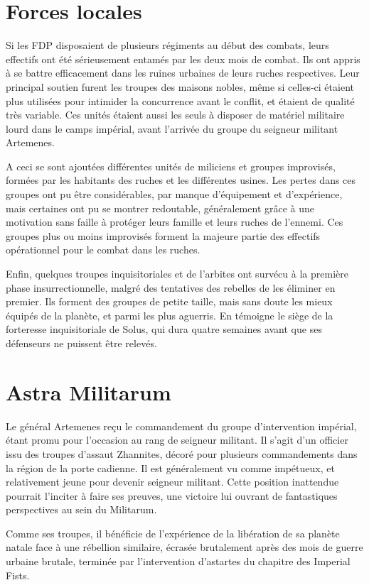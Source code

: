 \documentclass[10pt,a4paper]{book}
\begin{document}
\section{Forces locales}
Si les FDP disposaient de plusieurs régiments au début des combats, leurs effectifs ont été sérieusement entamés par les deux mois de combat. Ils ont appris à se battre efficacement dans les ruines urbaines de leurs ruches respectives. Leur principal soutien furent les troupes des maisons nobles, même si celles-ci étaient plus utilisées pour intimider la concurrence avant le conflit, et étaient de qualité très variable. Ces unités étaient aussi les seuls à disposer de matériel militaire lourd dans le camps impérial, avant l'arrivée du groupe du seigneur militant Artemenes.

A ceci se sont ajoutées différentes unités de miliciens et groupes improvisés, formées par les habitants des ruches et les différentes usines. Les pertes dans ces groupes ont pu être considérables, par manque d'équipement et d'expérience, mais certaines ont pu se montrer redoutable, généralement grâce à une motivation sans faille à protéger leurs famille et leurs ruches de l'ennemi. Ces groupes plus ou moins improvisés forment la majeure partie des effectifs opérationnel pour le combat dans les ruches.

Enfin, quelques troupes inquisitoriales et de l'arbites ont survécu à la première phase insurrectionnelle, malgré des tentatives des rebelles de les éliminer en premier. Ils forment des groupes de petite taille, mais sans doute les mieux équipés de la planète, et parmi les plus aguerris. En témoigne le siège de la forteresse inquisitoriale de Solus, qui dura quatre semaines avant que ses défenseurs ne puissent être relevés.
\section{Astra Militarum}
Le général Artemenes reçu le commandement du groupe d'intervention impérial, étant promu pour l'occasion au rang de seigneur militant. Il s'agit d'un officier issu des troupes d'assaut Zhannites, décoré pour plusieurs commandements dans la région de la porte cadienne. Il est généralement vu comme impétueux, et relativement jeune pour devenir seigneur militant. Cette position inattendue pourrait l'inciter à faire ses preuves, une victoire lui ouvrant de fantastiques perspectives au sein du Militarum.



Comme ses troupes, il bénéficie de l'expérience de la libération de sa planète natale face à une rébellion similaire, écrasée brutalement après des mois de guerre urbaine brutale, terminée par l'intervention d'astartes du chapitre des Imperial Fists. 
\end{document}
